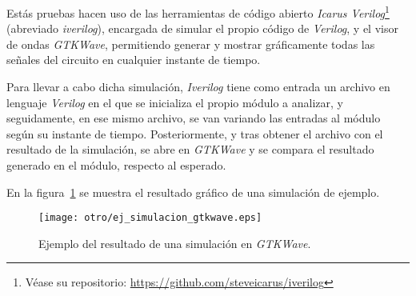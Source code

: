 Estás pruebas hacen uso de las herramientas de código abierto \emph{Icarus Verilog}\footnote{Véase su repositorio: \url{https://github.com/steveicarus/iverilog}} (abreviado \emph{iverilog}), encargada de simular el propio código de \emph{Verilog}, y el visor de ondas \emph{GTKWave}\cite{gtkwave2019}, permitiendo generar y mostrar gráficamente todas las señales del circuito en cualquier instante de tiempo.

Para llevar a cabo dicha simulación, \emph{Iverilog} tiene como entrada un archivo en lenguaje \emph{Verilog} en el que se inicializa el propio módulo a analizar, y seguidamente, en ese mismo archivo, se van variando las entradas al módulo según su instante de tiempo. Posteriormente, y tras obtener el archivo con el resultado de la simulación, se abre en \emph{GTKWave} y se compara el resultado generado en el módulo, respecto al esperado.

En la figura~\ref{fig:ej-gtkwave} se muestra el resultado gráfico de una simulación de ejemplo.

\begin{figure}[htb]
    \centering
    \texttt{[image: otro/ej\_simulacion\_gtkwave.eps]}
    \caption{Ejemplo del resultado de una simulación en \emph{GTKWave}.}
    \label{fig:ej-gtkwave}
\end{figure}


